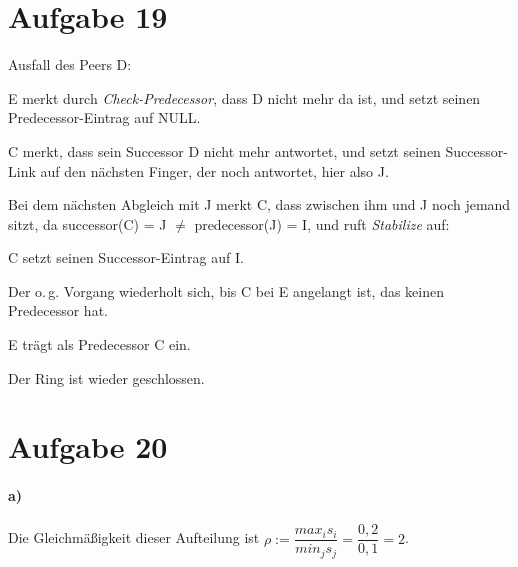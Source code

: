 \documentclass[10pt,a4paper]{article}
\begin{document}
\section*{Aufgabe 19} 
Ausfall des Peers D:
\begin{compactitem} [–]
	\item E merkt durch \textit{Check-Predecessor}, dass D nicht mehr da ist, und setzt seinen Predecessor-Eintrag auf NULL.
	\item C merkt, dass sein Successor D nicht mehr antwortet, und setzt seinen Successor-Link auf den nächsten Finger, der noch antwortet, hier also J.
	\item Bei dem nächsten Abgleich mit J merkt C, dass zwischen ihm und J noch jemand sitzt, da successor(C) = J $\neq$ predecessor(J) = I, und ruft \textit{Stabilize} auf:
	\begin{compactitem}
		\item C setzt seinen Successor-Eintrag auf I.
		\item Der o.\,g. Vorgang wiederholt sich, bis C bei E angelangt ist, das keinen Predecessor hat. 
		\item E trägt als Predecessor C ein.
	\end{compactitem}
	\item Der Ring ist wieder geschlossen.
\end{compactitem}

\section*{Aufgabe 20}
\paragraph*{a)} Die Gleichmäßigkeit dieser Aufteilung ist
$ρ:=\dfrac{max_i s_i}{min_j s_j} = \dfrac{0,2}{0,1} = 2$\quad.
\end{document}
